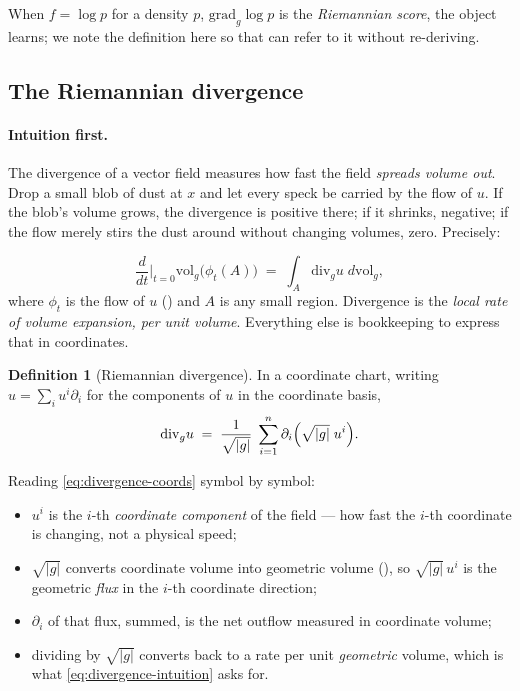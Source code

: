 \documentclass[11pt,a4paper]{report}
\theoremstyle{definition}
\newtheorem{definition}[definition]{Definition}
\theoremstyle{remark}
\begin{document}
When $f=\log p$ for a density $p$, $\mathrm{grad}_g\log p$ is the
\emph{Riemannian score}, the object  learns; we
note the definition here so that  can refer to it
without re-deriving.

\subsection{The Riemannian divergence}
\label{sec:riemannian-divergence}

\paragraph{Intuition first.} The divergence of a vector field measures how
fast the field \emph{spreads volume out}. Drop a small blob of dust at $x$
and let every speck be carried by the flow of $u$. If the blob's volume
grows, the divergence is positive there; if it shrinks, negative; if the
flow merely stirs the dust around without changing volumes, zero. Precisely:

\begin{equation}
\label{eq:divergence-intuition}
\frac{d}{dt}\bigg|_{t=0}\mathrm{vol}_g\bigl(\phi_t(A)\bigr)
\;=\;
\int_A \mathrm{div}_g u \;d\mathrm{vol}_g ,
\end{equation}
where $\phi_t$ is the flow of $u$ () and $A$ is
any small region. Divergence is the \emph{local rate of volume expansion,
per unit volume}. Everything else is bookkeeping to express that in
coordinates.

\begin{definition}[Riemannian divergence]
\label{def:riemannian-divergence}
In a coordinate chart, writing $u=\sum_iu^i\partial_i$ for the components of
$u$ in the coordinate basis,
\begin{equation}
\label{eq:divergence-coords}
\mathrm{div}_g u
\;=\;
\frac{1}{\sqrt{|g|}}\;\sum_{i=1}^n\partial_i\Bigl(\sqrt{|g|}\;u^i\Bigr) .
\end{equation}
\end{definition}

Reading \eqref{eq:divergence-coords} symbol by symbol:
\begin{itemize}
\item $u^i$ is the $i$-th \emph{coordinate component} of the field --- how
      fast the $i$-th coordinate is changing, not a physical speed;
\item $\sqrt{|g|}$ converts coordinate volume into geometric volume
      (), so $\sqrt{|g|}\,u^i$ is the geometric
      \emph{flux} in the $i$-th coordinate direction;
\item $\partial_i$ of that flux, summed, is the net outflow measured in
      coordinate volume;
\item dividing by $\sqrt{|g|}$ converts back to a rate per unit
      \emph{geometric} volume, which is what \eqref{eq:divergence-intuition}
      asks for.
\end{itemize}
\end{document}
